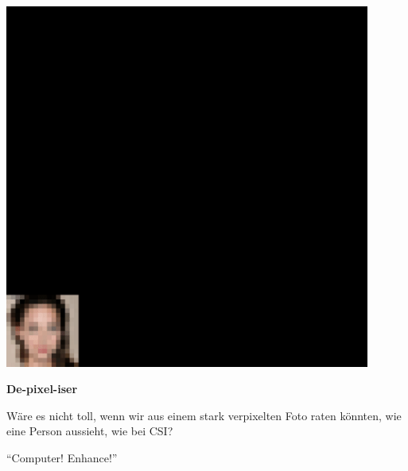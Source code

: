 \documentclass[aspectratio=169,usenames,dvipsnames]{beamer}
\begin{document}
\begin{frame}
\begin{minipage}{.5\textwidth}
\includegraphics[width=0.9\textwidth, keepaspectratio]{images/step-05}
\end{minipage}\begin{minipage}{.5\textwidth}
\textbf{De-pixel-iser}
\bigskip

Wäre es nicht toll, wenn wir aus einem stark verpixelten Foto raten könnten, wie eine Person aussieht, wie bei CSI?
\bigskip

``Computer! Enhance!''
\end{minipage}
\end{frame}
\end{document}
